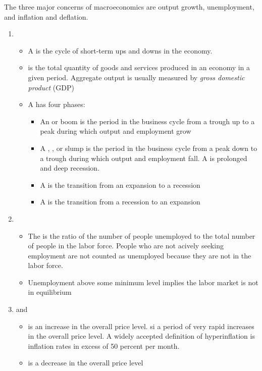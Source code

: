 \documentclass{article}
\begin{document}
 The three major concerns of macroeconomics are output growth, unemployment, and inflation and deflation. 
 \begin{enumerate}
   \item {}
     \begin{itemize}
       \item A  is the cycle of short-term ups and downs in the economy.  
       \item {} is the total quantity of goods and services produced in an economy in a given period. Aggregate output is usually measured by \emph{gross domestic product} (GDP)
       \item A  has four phases: 
         \begin{itemize}
           \item An  or boom is the period in the business cycle from a trough up to a peak during which output and employment grow 
           \item A , , or slump is the period in the business cycle from a peak down to a trough during which output and employment fall. A  is prolonged and deep recession. 
           \item A  is the transition from an expansion to a recession 
           \item A  is the transition from a recession to an expansion 
         \end{itemize}
     \end{itemize}
   \item {}
     \begin{itemize}
       \item The  is the ratio of the number of people unemployed to the total number of people in the labor force. People who are not acively seeking employment are not counted as unemployed because they are not in the labor force. 
       \item Unemployment above some minimum level implies the labor market is not in equilibrium 
     \end{itemize}
   \item {} and 
     \begin{itemize}
       \item {} is an increase in the overall price level.  si a period of very rapid increases in the overall price level. A widely accepted definition of hyperinflation is inflation rates in excess of 50 percent per month. 
       \item {} is a decrease in the overall price level
     \end{itemize}
 \end{enumerate}
\end{document}
